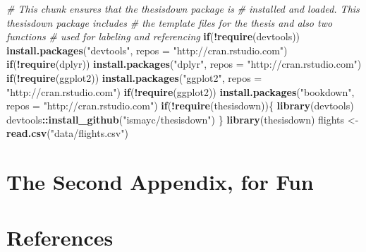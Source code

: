 \documentclass[12pt,twoside]{reedthesis}
\newenvironment{Shaded}{\begin{snugshade}}{\end{snugshade}}
\newcommand{\CommentTok}[1]{\textcolor[rgb]{0.56,0.35,0.01}{\textit{#1}}}
\newcommand{\ControlFlowTok}[1]{\textcolor[rgb]{0.13,0.29,0.53}{\textbf{#1}}}
\newcommand{\DataTypeTok}[1]{\textcolor[rgb]{0.13,0.29,0.53}{#1}}
\newcommand{\KeywordTok}[1]{\textcolor[rgb]{0.13,0.29,0.53}{\textbf{#1}}}
\newcommand{\NormalTok}[1]{#1}
\newcommand{\OperatorTok}[1]{\textcolor[rgb]{0.81,0.36,0.00}{\textbf{#1}}}
\newcommand{\StringTok}[1]{\textcolor[rgb]{0.31,0.60,0.02}{#1}}
\begin{document}
\begin{Shaded}
\begin{Highlighting}[]
\CommentTok{# This chunk ensures that the thesisdown package is}
\CommentTok{# installed and loaded. This thesisdown package includes}
\CommentTok{# the template files for the thesis and also two functions}
\CommentTok{# used for labeling and referencing}
\ControlFlowTok{if}\NormalTok{(}\OperatorTok{!}\KeywordTok{require}\NormalTok{(devtools))}
  \KeywordTok{install.packages}\NormalTok{(}\StringTok{"devtools"}\NormalTok{, }\DataTypeTok{repos =} \StringTok{"http://cran.rstudio.com"}\NormalTok{)}
\ControlFlowTok{if}\NormalTok{(}\OperatorTok{!}\KeywordTok{require}\NormalTok{(dplyr))}
    \KeywordTok{install.packages}\NormalTok{(}\StringTok{"dplyr"}\NormalTok{, }\DataTypeTok{repos =} \StringTok{"http://cran.rstudio.com"}\NormalTok{)}
\ControlFlowTok{if}\NormalTok{(}\OperatorTok{!}\KeywordTok{require}\NormalTok{(ggplot2))}
    \KeywordTok{install.packages}\NormalTok{(}\StringTok{"ggplot2"}\NormalTok{, }\DataTypeTok{repos =} \StringTok{"http://cran.rstudio.com"}\NormalTok{)}
\ControlFlowTok{if}\NormalTok{(}\OperatorTok{!}\KeywordTok{require}\NormalTok{(ggplot2))}
    \KeywordTok{install.packages}\NormalTok{(}\StringTok{"bookdown"}\NormalTok{, }\DataTypeTok{repos =} \StringTok{"http://cran.rstudio.com"}\NormalTok{)}
\ControlFlowTok{if}\NormalTok{(}\OperatorTok{!}\KeywordTok{require}\NormalTok{(thesisdown))\{}
  \KeywordTok{library}\NormalTok{(devtools)}
\NormalTok{  devtools}\OperatorTok{::}\KeywordTok{install_github}\NormalTok{(}\StringTok{"ismayc/thesisdown"}\NormalTok{)}
\NormalTok{  \}}
\KeywordTok{library}\NormalTok{(thesisdown)}
\NormalTok{flights <-}\StringTok{ }\KeywordTok{read.csv}\NormalTok{(}\StringTok{"data/flights.csv"}\NormalTok{)}
\end{Highlighting}
\end{Shaded}
\hypertarget{the-second-appendix-for-fun}{%
\chapter{The Second Appendix, for Fun}\label{the-second-appendix-for-fun}}

\backmatter

\hypertarget{references}{%
\chapter*{References}\label{references}}

\end{document}
